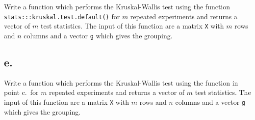 \documentclass[
]{article}
\newenvironment{Shaded}{\begin{snugshade}}{\end{snugshade}}
\newcommand{\CommentTok}[1]{\textcolor[rgb]{0.56,0.35,0.01}{\textit{#1}}}
\newcommand{\ControlFlowTok}[1]{\textcolor[rgb]{0.13,0.29,0.53}{\textbf{#1}}}
\newcommand{\DecValTok}[1]{\textcolor[rgb]{0.00,0.00,0.81}{#1}}
\newcommand{\FunctionTok}[1]{\textcolor[rgb]{0.13,0.29,0.53}{\textbf{#1}}}
\newcommand{\NormalTok}[1]{#1}
\newcommand{\OtherTok}[1]{\textcolor[rgb]{0.56,0.35,0.01}{#1}}
\newcommand{\SpecialCharTok}[1]{\textcolor[rgb]{0.81,0.36,0.00}{\textbf{#1}}}
\newcommand{\StringTok}[1]{\textcolor[rgb]{0.31,0.60,0.02}{#1}}
\begin{document}
Write a function which performs the Kruskal-Wallis test using the
function \texttt{stats:::kruskal.test.default()} for \(m\) repeated
experiments and returns a vector of \(m\) test statistics. The input of
this function are a matrix \texttt{X} with \(m\) rows and \(n\) columns
and a vector \texttt{g} which gives the grouping.

\begin{Shaded}
\end{Shaded}

\subsection{e.}\label{e.-2}

Write a function which performs the Kruskal-Wallis test using the
function in point c.~for \(m\) repeated experiments and returns a vector
of \(m\) test statistics. The input of this function are a matrix
\texttt{X} with \(m\) rows and \(n\) columns and a vector \texttt{g}
which gives the grouping.
\end{document}
